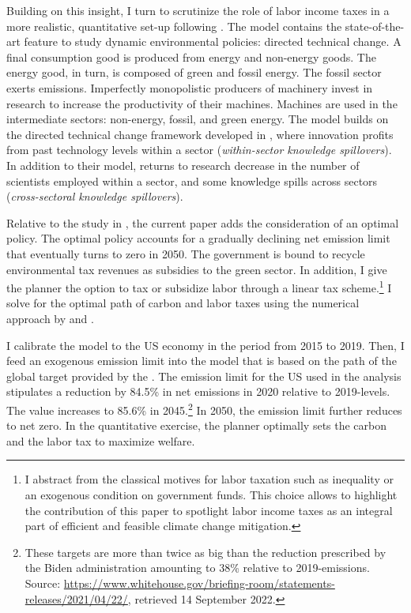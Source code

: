  Building on this insight, I turn to scrutinize the role of labor income taxes in a more realistic, quantitative set-up following \cite{Fried2018ClimateAnalysis}. The model contains the state-of-the-art feature to study dynamic environmental policies: directed technical change.  A final consumption good is produced from energy and non-energy goods. The energy good, in turn, is composed of green and fossil energy. The fossil sector exerts emissions. Imperfectly monopolistic producers of machinery invest in research to increase the productivity of their machines. Machines are used in the intermediate sectors: non-energy, fossil, and green energy.  The model builds on the directed technical change framework developed in \cite{Acemoglu2012TheChange}, where innovation profits from past technology levels within a sector (\textit{within-sector knowledge spillovers}). In addition to their model, returns to research decrease in the number of scientists employed within a sector, and some knowledge spills across sectors (\textit{cross-sectoral knowledge spillovers}).
 
Relative to the study in \cite{Fried2018ClimateAnalysis}, the current paper adds the consideration of an optimal policy. The optimal policy accounts for a gradually declining net emission limit that eventually turns to zero in 2050.
 The government is bound to recycle environmental tax revenues as subsidies to the green sector. In addition, I give the planner the option to tax or subsidize labor through a linear tax scheme.\footnote{I abstract from the classical motives for labor taxation such as inequality or an exogenous condition on government funds. This choice allows to highlight the contribution of this paper to spotlight labor income taxes as an integral part of efficient and feasible climate change mitigation. }
 I solve for the optimal path of carbon and labor taxes using the numerical approach by \cite{Jones1993OptimalGrowth} and \cite{Barrage2019OptimalPolicy}.

I calibrate the model to the US economy in the period from 2015 to 2019. Then, I feed an exogenous emission limit into the model that is based on the path of the global target provided by the \cite{IPCC2022}. The emission limit for the US used in the analysis stipulates a reduction by 84.5\% in net emissions  in 2020 relative to 2019-levels. The value increases to 85.6\% in 2045.\footnote{ These targets are more than twice as big than the reduction prescribed by the Biden administration amounting to 38\% relative to 2019-emissions. Source:  \href{https://www.whitehouse.gov/briefing-room/statements-releases/2021/04/22/fact-sheet-president-biden-sets-2030-greenhouse-gas-pollution-reduction-target-aimed-at-creating-good-paying-union-jobs-and-securing-u-s-leadership-on-clean-energy-technologies/}{https://www.whitehouse.gov/briefing-room/statements-releases/2021/04/22/}, retrieved 14 September 2022.} In 2050, the emission limit further reduces to net zero.
In the quantitative exercise, the planner optimally sets the carbon and the labor tax to maximize welfare.


